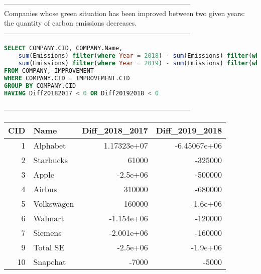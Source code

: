 --------------------------------------------------------------------------------
\\Companies whose green situation has been improved between two given years: the quantity of carbon emissions decreases.\\
--------------------------------------------------------------------------------
\begin{lstlisting}[language = SQL]
SELECT COMPANY.CID, COMPANY.Name, 
	sum(Emissions) filter(where Year = 2018) - sum(Emissions) filter(where Year = 2017) Diff20182017,
	sum(Emissions) filter(where Year = 2019) - sum(Emissions) filter(where Year = 2018) Diff20192018 
FROM COMPANY, IMPROVEMENT 
WHERE COMPANY.CID = IMPROVEMENT.CID 
GROUP BY COMPANY.CID 
HAVING Diff20182017 < 0 OR Diff20192018 < 0
\end{lstlisting}
--------------------------------------------------------------------------------
\\\begin{tabular}{rlrr}
\toprule
   CID & Name       &   Diff\_2018\_2017 &    Diff\_2019\_2018 \\
\midrule
     1 & Alphabet   &      1.17323e+07 &      -6.45067e+06 \\
     2 & Starbucks  &  61000           & -325000           \\
     3 & Apple      &     -2.5e+06     & -500000           \\
     4 & Airbus     & 310000           & -680000           \\
     5 & Volkswagen & 160000           &      -1.6e+06     \\
     6 & Walmart    &     -1.154e+06   & -120000           \\
     7 & Siemens    &     -2.001e+06   & -160000           \\
     9 & Total SE   &     -2.5e+06     &      -1.9e+06     \\
    10 & Snapchat   &  -7000           &   -5000           \\
\bottomrule
\end{tabular}